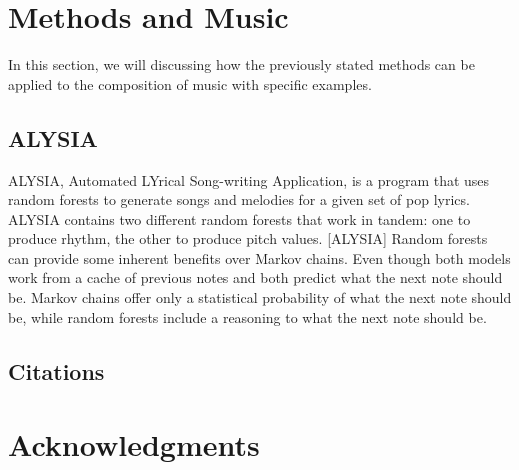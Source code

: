 \documentclass{sig-alternate}
\begin{document}
\section{Methods and Music}
	In this section, we will discussing how the previously stated methods can be applied to the composition of music with specific examples.

\subsection{ALYSIA}
\label{sec:ALYSIA}
	ALYSIA, Automated LYrical Song-writing Application, is a program that uses random forests to generate songs and melodies for a given set of pop lyrics. ALYSIA contains two different random forests that work in tandem: one to produce rhythm, the other to produce pitch values. [ALYSIA] Random forests can provide some inherent benefits over Markov chains. Even though both models work from a cache of previous notes and both predict what the next note should be. Markov chains offer only a statistical probability of what the next note should be, while random forests include a reasoning to what the next note should be. 


\label{sec:methodsandmusic}
\subsection{Citations}
\label{sec:citations}

\subsection{}
\label{sec:theoremLikeConstructs}


\subsection*{}
\label{sec:caveatForExperts}



\section*{Acknowledgments}
\label{sec:acknowledgments}



  
\end{document}
